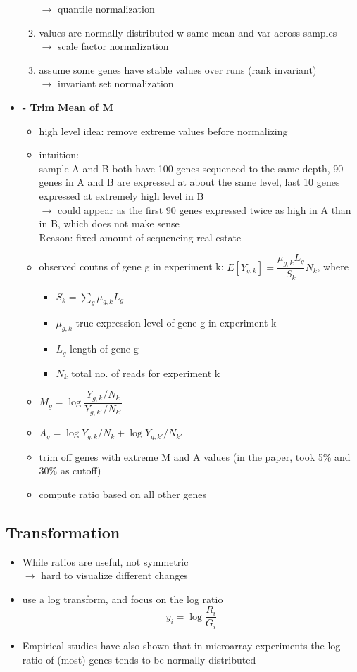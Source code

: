 \documentclass[font=12pt]{article}
\begin{document}
\begin{itemize}
\begin{enumerate}
		$\to$ quantile normalization
		\item values are normally distributed w same mean and var across samples\\
		$\to$ scale factor normalization
		\item assume some genes have stable values over runs (rank invariant)\\
		$\to$ invariant set normalization
	\end{enumerate}
	\item \textbf{ - Trim Mean of M}
	\begin{itemize}
		\item high level idea: remove extreme values before normalizing
		\item intuition:\\
		sample A and B both have 100 genes sequenced to the same depth, 90 genes in A and B are expressed at about the same level, last 10 genes expressed at extremely high level in B\\
		$\to$ could appear as the first 90 genes expressed twice as high in A than in B, which does not make sense\\
		Reason: fixed amount of sequencing real estate
		\item observed coutns of gene g in experiment k: $ E[Y_{g,k}] = \dfrac{\mu_{g,k} L_g}{S_k} N_k $, where
		\begin{itemize}
			\item $ S_k = \sum_g \mu_{g,k}L_g $
			\item $ \mu_{g,k} $ true expression level of gene g in experiment k
			\item $ L_g $ length of gene g
			\item $ N_k $ total no. of reads for experiment k
		\end{itemize}
		\item $ M_g = \log \dfrac{Y_{g,k}/N_k}{Y_{g,k'}/N_{k'}} $
		\item $ A_g =  \log Y_{g,k}/N_k + \log Y_{g,k'}/N_{k'}$
		\item trim off genes with extreme M and A values (in the paper, took 5\% and 30\% as cutoff)
		\item compute ratio based on all other genes
	\end{itemize}
\end{itemize}
\subsection{Transformation}
\begin{itemize}
	\item While ratios are useful, not symmetric\\
	$\to$ hard to visualize different changes
	\item use a log transform, and focus on the log ratio
	\[y_i = \log \dfrac{R_i}{G_i}\]
	\item Empirical studies have also shown that in microarray experiments the log ratio of (most) genes tends to be normally distributed
\end{itemize}
\end{document}
